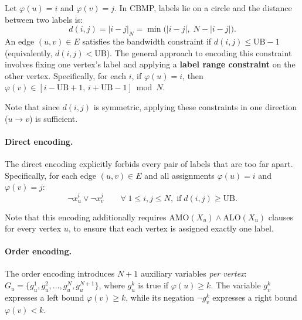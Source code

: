 \documentclass[a4paper,fleqn]{cas-sc}
\begin{document}
        Let $\varphi(u)=i$ and $\varphi(v)=j$. In CBMP, labels lie on a circle and the distance between two labels is:
        \begin{equation}
            \label{eq:cyclic_distance}
            d(i,j) = |i-j|_N = \min\bigl(|i-j|,\; N-|i-j|\bigr).
        \end{equation}
        An edge $(u,v)\in E$ satisfies the bandwidth constraint if $d(i,j) \le \text{UB}-1$ (equivalently, $d(i,j) < \text{UB}$). The general approach to encoding this constraint involves fixing one vertex's label and applying a \textbf{label range constraint} on the other vertex. Specifically, for each $i$, if $\varphi(u)=i$, then $\varphi(v) \in [i-\text{UB}+1,\, i+\text{UB}-1] \bmod N$.
        
        \vspace{1em}

        Note that since $d(i,j)$ is symmetric, applying these constraints in one direction ($u \to v$) is sufficient. 

        \paragraph{\textbf{Direct encoding.}}
            The direct encoding explicitly forbids every pair of labels that are too far apart. Specifically, for each edge $(u,v)\in E$ and all assignments $\varphi(u)=i$ and $\varphi(v)=j$:
            \begin{equation}
                \neg x_u^i \vee \neg x_v^j \qquad \forall \; 1 \le i,j \le N,\; \text{if} \; d(i,j) \geq \text{UB}.
            \end{equation}

            \vspace{1em}

            Note that this encoding additionally requires $\text{AMO}(X_u) \wedge \text{ALO}(X_u)$ clauses for every vertex $u$, to ensure that each vertex is assigned exactly one label.

        \paragraph{\textbf{Order encoding.}}
            The order encoding introduces $N+1$ auxiliary variables \textit{per vertex}: $G_u=\{g_u^1, g_u^2,\dots, g_u^N, g_u^{N+1}\}$, where $g_u^k$ is true if $\varphi(u) \ge k$. The variable $g_v^k$ expresses a left bound $\varphi(v) \geq k$, while its negation $\neg g_v^k$ expresses a right bound $\varphi(v) < k$.
            
\end{document}
